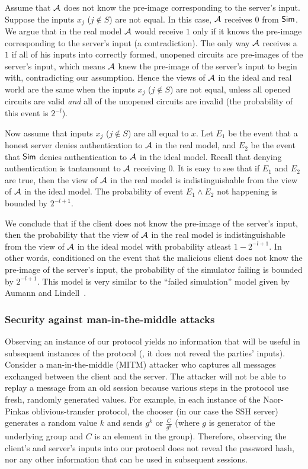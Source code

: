Assume that ${\cal A}$ does not know the pre-image corresponding to
the server's input.  Suppose the inputs  $x_j$ ($j \not\in S$) are not
equal. In this case, ${\cal A}$ receives $0$ from ${\sf Sim}$. We argue
that in the real model ${\cal A}$ would receive $1$ only if it knows
the pre-image corresponding to the server's input (a contradiction).
The only way ${\cal A}$ receives a $1$ if all of his inputs into correctly
formed, unopened circuits are pre-images of the server's input, which
means ${\cal A}$ knew the pre-image of the server's input to begin with,
contradicting our assumption.  Hence the views of ${\cal A}$ in the
ideal and real world are the same when the inputs $x_j$ ($j \not\in S$)
are not equal, unless all opened circuits are valid \emph{and} all of the
unopened circuits are invalid (the probability of this event is $2^{-l}$).

Now assume that inputs $x_j$ ($j \not\in S$) are all equal to $x$.
Let $E_1$ be the event that a honest server denies authentication to
${\cal A}$ in the real model, and $E_2$ be the event that ${\sf Sim}$
denies authentication to ${\cal A}$ in the ideal model. Recall that
denying authentication is tantamount to ${\cal A}$ receiving $0$. It is
easy to see that if $E_1$ and $E_2$ are true, then the view of ${\cal A}$
in the real model is indistinguishable from the view of ${\cal A}$ in
the ideal model. The probability of event $E_1 \wedge E_2$ not happening
is bounded by $2^{-l+1}$.

We conclude that if the client does not know the pre-image of the server's
input, then the probability that the view of ${\cal A}$ in the real model
is indistinguishable from the view of ${\cal A}$ in the ideal model
with probability atleast $1-2^{-l+1}$.  In other words, conditioned
on the event that the malicious client does not know the pre-image of
the server's input, the probability of the simulator failing is bounded
by $2^{-l+1}$.  This model is very similar to the ``failed simulation''
model given by Aumann and Lindell~\cite[Section 3.2]{aumannlindell}.

\subsubsection{Security against man-in-the-middle attacks}

Observing an instance of our protocol yields no information that will
be useful in subsequent instances of the protocol (\eg, it does not
reveal the parties' inputs).  Consider a man-in-the-middle (MITM)
attacker who captures all messages exchanged between the client and
the server.  The attacker will not be able to replay a message from an
old session because various steps in the protocol use fresh, randomly
generated values.  For example, in each instance of the Naor-Pinkas
oblivious-transfer protocol, the chooser (in our case the SSH server)
generates a random value $k$ and sends $g^k$ or $\frac{C}{g^k}$ (where $g$
is generator of the underlying group and $C$ is an element in the group).
Therefore, observing the client's and server's inputs into our protocol
does not reveal the password hash, nor any other information that can
be used in subsequent sessions.

